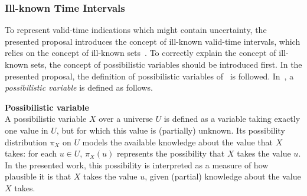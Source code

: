 

\subsubsection{Ill-known Time Intervals}
\label{subsec:representation-time-intervals}


To represent valid-time indications which might contain uncertainty, the presented proposal introduces the concept of ill-known valid-time intervals, which relies on the concept of ill-known sets~\cite{Dubois88b}. To correctly explain the concept of ill-known sets, the concept of possibilistic variables should be introduced first. In the presented proposal, the definition of possibilistic variables of~\cite{Pon11} is followed. In~\cite{Pon11}, a \emph{possibilistic variable} is defined as follows.


\begin{svgraybox}
\vspace{-10pt}
\begin{definition}
\textbf{Possibilistic variable}~\cite{Pon11}\\
A possibilistic variable $X$ over a universe $U$ is defined as a variable taking exactly one value in $U$, but for which this value is (partially) unknown. Its possibility distribution $\pi_X$ on $U$ models the available knowledge about the value that $X$ takes: for each $u\in U$, $\pi_X(u)$ represents the possibility that $X$ takes the value $u$. In the presented work, this possibility is interpreted as a measure of how plausible it is that $X$ takes the value $u$, given (partial) knowledge about the value $X$ takes.
\end{definition}
\vspace{-10pt}
\end{svgraybox}


